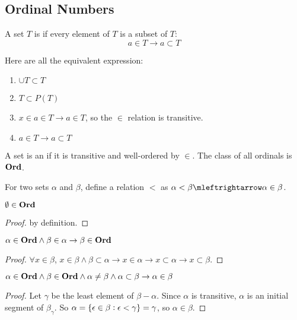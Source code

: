 \subsection{Ordinal Numbers}

\begin{definition}
    A set $T$ is  if every element of $T$ is a subset of $T$:
    \begin{equation}
        a \in T \rightarrow a \subset T
    \end{equation}
    
    Here are all the equivalent expression:
    \begin{enumerate}
        \item $\cup T \subset T$ 
        \item $T \subset P(T)$
        \item $x \in a \in T \rightarrow a \in T$, so the $\in$ relation is transitive.
        \item $a \in T \rightarrow a \subset T$
    \end{enumerate}
\end{definition}

\begin{definition}
    A set is an  if it is transitive and well-ordered by $\in$. The class of all ordinals is $\mathbf{Ord}$.
\end{definition}

\begin{definition}
    For two sets $\alpha$ and $\beta$, define a relation $<$ as $\alpha < \beta \mleftrightarrow \alpha \in \beta$.
\end{definition}

\begin{theorem}
    $\emptyset \in \mathbf{Ord}$
\end{theorem}
\begin{proof}
    by definition.
\end{proof}

\begin{theorem}
    $\alpha \in \mathbf{Ord} \wedge \beta \in \alpha \rightarrow \beta \in \mathbf{Ord}$
\end{theorem}
\begin{proof}
    $\forall x \in \beta$, $x \in \beta \wedge \beta \subset \alpha \rightarrow x \in \alpha \rightarrow x \subset \alpha \rightarrow x \subset \beta $.
\end{proof}

\begin{theorem}
    $\alpha \in \mathbf{Ord} \wedge \beta \in \mathbf{Ord} \wedge \alpha \neq \beta \wedge \alpha \subset \beta  \rightarrow \alpha \in \beta$    
\end{theorem}
\begin{proof}
    Let $\gamma$ be the least element of $\beta - \alpha$. Since $\alpha$ is transitive, $\alpha$ is an initial segment of $\beta_\gamma$. So $\alpha = \set{\epsilon \in \beta: \epsilon < \gamma} = \gamma$, so $\alpha \in \beta$.
\end{proof}

